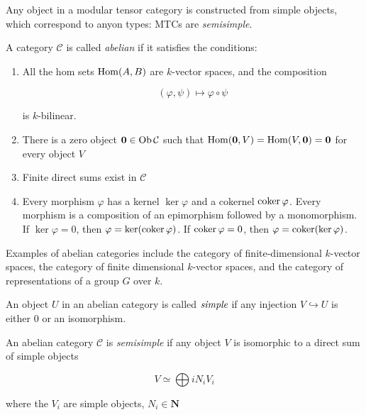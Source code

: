 Any object in a modular tensor category is constructed from simple objects,
which correspond to anyon types: MTCs are \emph{semisimple}.

\begin{defn}
    A category $\mathcal{C}$ is called \emph{abelian} if it satisfies the conditions:

    \begin{enumerate}
    \renewcommand{\labelenumi}{\roman{enumi})}
        \item All the hom sets $\operatorname{Hom}(A,B)$ are $k$-vector spaces, and the composition
            
            \begin{equation}
                (\varphi, \psi) \mapsto \varphi \circ \psi
            \end{equation}

            is $k$-bilinear.
        \item There is a zero object $\mathbf{0} \in \operatorname{Ob} \mathcal{C}$ such that
            $\operatorname{Hom}(\mathbf{0},V) = \operatorname{Hom}(V,\mathbf{0}) = \mathbf{0}$ for every object $V$
        \item Finite direct sums exist in $\mathcal{C}$
        \item Every morphism $\varphi$ has a kernel $\ker \varphi$ and a
            cokernel $\operatorname{coker} \varphi$. Every morphism is a composition of an
            epimorphism followed by a monomorphism. If $\ker \varphi = 0$, then
            $\varphi = \ker(\operatorname{coker} \varphi)$. If $\operatorname{coker} \varphi = 0$, then
            $\varphi = \operatorname{coker}(\ker \varphi)$.
    \end{enumerate}

    Examples of abelian categories include the category of finite-dimensional $k$-vector spaces,
    the category of finite dimensional $k$-vector spaces, and the category of
    representations of a group $G$ over $k$.

\end{defn}

\begin{defn}
    An object $U$ in an abelian category is called $\emph{simple}$ if any
    injection $V \hookrightarrow U$ is either $0$ or an isomorphism.
\end{defn}

\begin{defn}
    An abelian category $\mathcal{C}$ is \emph{semisimple} if any object $V$ is isomorphic to a direct sum of simple objects

    \begin{equation}
        V \simeq \bigoplus{i} N_i V_i
    \end{equation}

    where the $V_i$ are simple objects, $N_i \in \mathbf{N}$

\end{defn}

